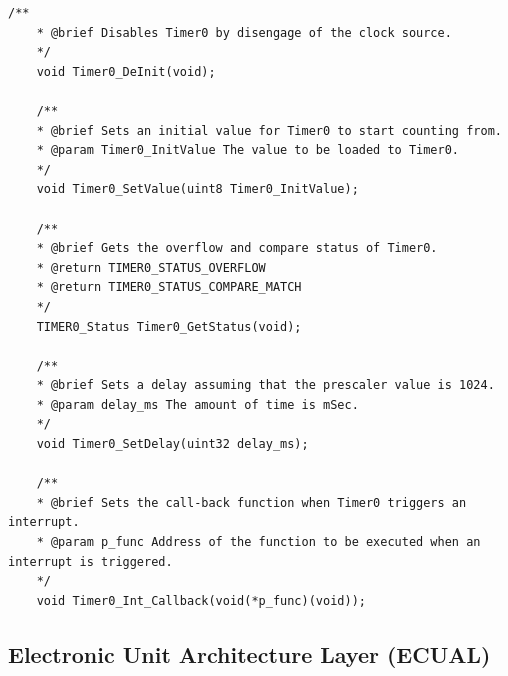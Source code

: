 \documentclass[10pt]{article}
\begin{document}
\begin{lstlisting}[style=CStyle,escapeinside=``]
	/**
	* @brief Disables Timer0 by disengage of the clock source.
	*/
	void Timer0_DeInit(void);
	
	/**
	* @brief Sets an initial value for Timer0 to start counting from.
	* @param Timer0_InitValue The value to be loaded to Timer0.
	*/
	void Timer0_SetValue(uint8 Timer0_InitValue);
	
	/**
	* @brief Gets the overflow and compare status of Timer0.
	* @return TIMER0_STATUS_OVERFLOW
	* @return TIMER0_STATUS_COMPARE_MATCH
	*/
	TIMER0_Status Timer0_GetStatus(void);
	
	/**
	* @brief Sets a delay assuming that the prescaler value is 1024.
	* @param delay_ms The amount of time is mSec.
	*/
	void Timer0_SetDelay(uint32 delay_ms);
	
	/**
	* @brief Sets the call-back function when Timer0 triggers an interrupt.
	* @param p_func Address of the function to be executed when an interrupt is triggered.
	*/
	void Timer0_Int_Callback(void(*p_func)(void));
\end{lstlisting}

\subsection{Electronic Unit Architecture Layer (ECUAL)}
\end{document}
